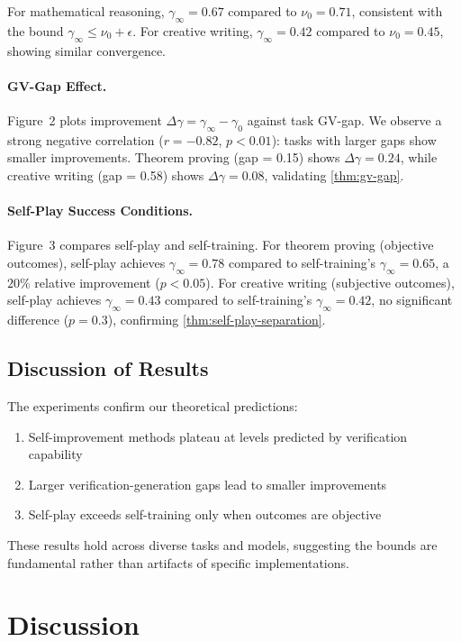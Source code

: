 \documentclass{article}
\theoremstyle{definition}
\theoremstyle{remark}
\begin{document}
For mathematical reasoning, \(\gamma_\infty = 0.67\) compared to \(\nu_0 = 0.71\), consistent with the bound \(\gamma_\infty \leq \nu_0 + \epsilon\). For creative writing, \(\gamma_\infty = 0.42\) compared to \(\nu_0 = 0.45\), showing similar convergence.

\paragraph{GV-Gap Effect.} Figure~2 plots improvement \(\Delta\gamma = \gamma_\infty - \gamma_0\) against task GV-gap. We observe a strong negative correlation (\(r = -0.82\), \(p < 0.01\)): tasks with larger gaps show smaller improvements. Theorem proving (gap = 0.15) shows \(\Delta\gamma = 0.24\), while creative writing (gap = 0.58) shows \(\Delta\gamma = 0.08\), validating \cref{thm:gv-gap}.

\paragraph{Self-Play Success Conditions.} Figure~3 compares self-play and self-training. For theorem proving (objective outcomes), self-play achieves \(\gamma_\infty = 0.78\) compared to self-training's \(\gamma_\infty = 0.65\), a \(20\%\) relative improvement (\(p < 0.05\)). For creative writing (subjective outcomes), self-play achieves \(\gamma_\infty = 0.43\) compared to self-training's \(\gamma_\infty = 0.42\), no significant difference (\(p = 0.3\)), confirming \cref{thm:self-play-separation}.

\subsection{Discussion of Results}

The experiments confirm our theoretical predictions:
\begin{enumerate}
\item Self-improvement methods plateau at levels predicted by verification capability
\item Larger verification-generation gaps lead to smaller improvements
\item Self-play exceeds self-training only when outcomes are objective
\end{enumerate}

These results hold across diverse tasks and models, suggesting the bounds are fundamental rather than artifacts of specific implementations.

\section{Discussion}
\label{sec:discussion}
\end{document}
